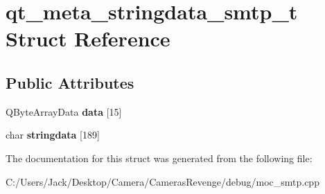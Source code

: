 \hypertarget{structqt__meta__stringdata__smtp__t}{\section{qt\+\_\+meta\+\_\+stringdata\+\_\+smtp\+\_\+t Struct Reference}
\label{structqt__meta__stringdata__smtp__t}
}
\subsection*{Public Attributes}
\begin{DoxyCompactItemize}
\item 
\hypertarget{structqt__meta__stringdata__smtp__t_af02b2ce4f7810bf13471ad14fb0dba2c}{Q\+Byte\+Array\+Data {\bfseries data} \mbox{[}15\mbox{]}}\label{structqt__meta__stringdata__smtp__t_af02b2ce4f7810bf13471ad14fb0dba2c}

\item 
\hypertarget{structqt__meta__stringdata__smtp__t_a96676be0474493ab68cb834f7b7fd3cf}{char {\bfseries stringdata} \mbox{[}189\mbox{]}}\label{structqt__meta__stringdata__smtp__t_a96676be0474493ab68cb834f7b7fd3cf}

\end{DoxyCompactItemize}


The documentation for this struct was generated from the following file\+:\begin{DoxyCompactItemize}
\item 
C\+:/\+Users/\+Jack/\+Desktop/\+Camera/\+Cameras\+Revenge/debug/moc\+\_\+smtp.\+cpp\end{DoxyCompactItemize}
